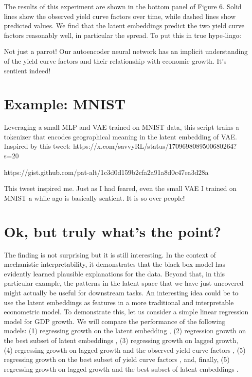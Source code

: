 \documentclass{article}
\theoremstyle{plain}
\theoremstyle{definition}
\theoremstyle{remark}
\begin{document}
The results of this experiment are shown in the bottom panel of Figure 6. Solid lines show the observed yield curve factors over time, while dashed lines show predicted values. We find that the latent embeddings predict the two yield curve factors reasonably well, in particular the spread. To put this in true hype-lingo:

Not just a parrot! Our autoencoder neural network has an implicit understanding of the yield curve factors and their relationship with economic growth. It’s sentient indeed!

\section{Example: MNIST}

Leveraging a small MLP and VAE trained on MNIST data, this script trains a tokenizer that encodes geographical meaning in the latent embedding of VAE. Inspired by this tweet: https://x.com/savvyRL/status/1709698089500680264?s=20

https://gist.github.com/pat-alt/1c3d0d159b2cfa2a91a8d0c47ea3d28a

This tweet inspired me. Just as I had feared, even the small VAE I trained on MNIST a while ago is basically sentient. It is so over people!

\section{Ok, but truly what’s the point?}

The finding is not surprising but it is still interesting. In the context of mechanistic interpretability, it demonstrates that the black-box model has evidently learned plausible explanations for the data. Beyond that, in this particular example, the patterns in the latent space that we have just uncovered might actually be useful for downstream tasks. An interesting idea could be to use the latent embeddings as features in a more traditional and interpretable econometric model. To demonstrate this, let us consider a simple linear regression model for GDP growth. We will compare the performance of the following models: (1) regressing growth 
 on the latent embedding 
, (2) regression growth on the best subset of latent embeddings 
, (3) regressing growth on lagged growth, (4) regressing growth on lagged growth and the observed yield curve factors 
, (5) regressing growth on the best subset of yield curve factors 
, and, finally, (5) regressing growth on lagged growth and the best subset of latent embeddings 
.
\end{document}
